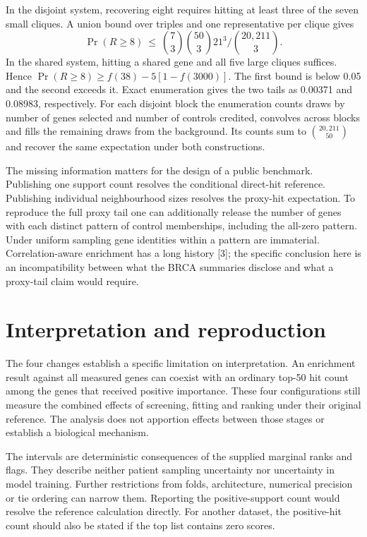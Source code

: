 \documentclass[11pt]{article}
\begin{document}
In the disjoint system, recovering eight requires hitting at least three of the seven small cliques. A union bound over triples and one representative per clique gives
\[
 \Pr(R\ge8)\ \le\ \binom73\binom{50}3 21^3/\binom{20{,}211}3 .
\]
In the shared system, hitting a shared gene and all five large cliques suffices. Hence $\Pr(R\ge8)\ge f(38)-5[1-f(3000)]$. The first bound is below 0.05 and the second exceeds it. Exact enumeration gives the two tails as 0.00371 and 0.08983, respectively. For each disjoint block the enumeration counts draws by number of genes selected and number of controls credited, convolves across blocks and fills the remaining draws from the background. Its counts sum to $\binom{20{,}211}{50}$ and recover the same expectation under both constructions.

The missing information matters for the design of a public benchmark. Publishing one support count resolves the conditional direct-hit reference. Publishing individual neighbourhood sizes resolves the proxy-hit expectation. To reproduce the full proxy tail one can additionally release the number of genes with each distinct pattern of control memberships, including the all-zero pattern. Under uniform sampling gene identities within a pattern are immaterial. Correlation-aware enrichment has a long history [3]; the specific conclusion here is an incompatibility between what the BRCA summaries disclose and what a proxy-tail claim would require.

\newpage
\section{Interpretation and reproduction}
The four changes establish a specific limitation on interpretation. An enrichment result against all measured genes can coexist with an ordinary top-50 hit count among the genes that received positive importance. These four configurations still measure the combined effects of screening, fitting and ranking under their original reference. The analysis does not apportion effects between those stages or establish a biological mechanism.

The intervals are deterministic consequences of the supplied marginal ranks and flags. They describe neither patient sampling uncertainty nor uncertainty in model training. Further restrictions from folds, architecture, numerical precision or tie ordering can narrow them. Reporting the positive-support count would resolve the reference calculation directly. For another dataset, the positive-hit count should also be stated if the top list contains zero scores.
\end{document}
